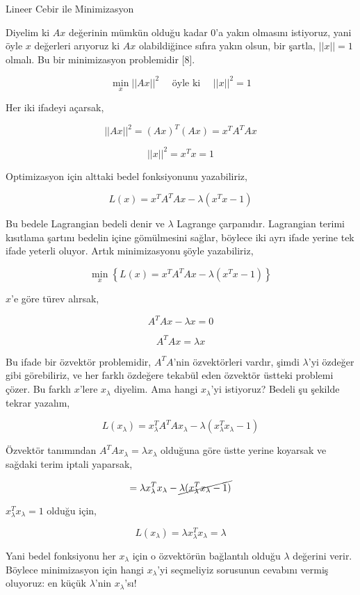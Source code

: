 \documentclass[12pt,fleqn]{article}\usepackage{../../common}
\begin{document}
Lineer Cebir ile Minimizasyon

Diyelim ki $Ax$ değerinin mümkün olduğu kadar 0'a yakın olmasını istiyoruz,
yani öyle $x$ değerleri arıyoruz ki $Ax$ olabildiğince sıfıra yakın olsun, bir
şartla, $||x||=1$ olmalı. Bu bir minimizasyon problemidir [8].

$$ \min_{x} ||Ax||^2 \quad \textrm{ öyle ki } \quad ||x||^2 = 1  $$

Her iki ifadeyi açarsak,

$$ ||Ax||^2  = (Ax)^T(Ax) = x^TA^TAx $$

$$ ||x||^2 = x^Tx = 1$$

Optimizasyon için alttaki bedel fonksiyonunu yazabiliriz,

$$ L(x) = x^TA^TAx - \lambda (x^Tx-1) $$

Bu bedele Lagrangian bedeli denir ve $\lambda$ Lagrange çarpanıdır. Lagrangian
terimi kısıtlama şartını bedelin içine gömülmesini sağlar, böylece iki ayrı
ifade yerine tek ifade yeterli oluyor. Artık minimizasyonu şöyle yazabiliriz,

$$ \min_{x} \left\{ L(x) = x^T A^T A x - \lambda (x^T x-1) \right\} $$

$x$'e göre türev alırsak,

$$ A^TAx - \lambda x = 0 $$

$$ A^TAx = \lambda x $$

Bu ifade bir özvektör problemidir, $A^TA$'nin özvektörleri vardır, şimdi
$\lambda$'yi özdeğer gibi görebiliriz, ve her farklı özdeğere tekabül eden
özvektör üstteki problemi çözer. Bu farklı $x$'lere $x_\lambda$ diyelim. Ama
hangi $x_\lambda$'yi istiyoruz? Bedeli şu şekilde tekrar yazalım,

$$ L(x_\lambda) = x_\lambda^T A^T A x_\lambda - \lambda (x_\lambda^Tx_\lambda-1) $$

Özvektör tanımından $A^TA  x_\lambda = \lambda x_\lambda$ olduğuna göre üstte
yerine koyarsak ve sağdaki terim iptali yaparsak,

$$  = \lambda x_\lambda^T  x_\lambda - \cancel{\lambda (x_\lambda^Tx_\lambda-1)} $$

$x_\lambda^T  x_\lambda = 1$ olduğu için,

$$ L(x_\lambda) = \lambda x_\lambda^T  x_\lambda  = \lambda$$

Yani bedel fonksiyonu her $x_\lambda$ için o özvektörün bağlantılı olduğu
$\lambda$ değerini verir. Böylece minimizasyon için hangi $x_\lambda$'yi
seçmeliyiz sorusunun cevabını vermiş oluyoruz: en küçük $\lambda$'nin
$x_\lambda$'sı!
\end{document}
